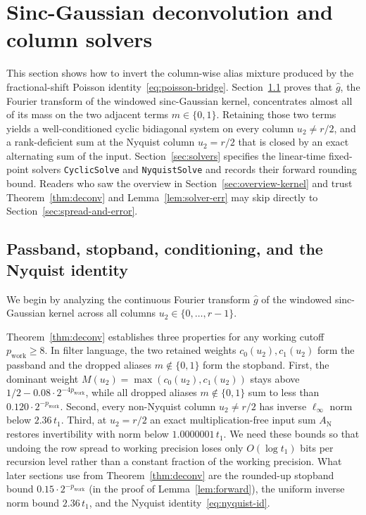 \section{Sinc-Gaussian deconvolution and column solvers}\label{sec:deconv}

This section shows how to invert the column-wise alias mixture produced by the fractional-shift Poisson identity~\eqref{eq:poisson-bridge}. Section~\ref{sec:deconv-thm} proves that $\hat{g}$, the Fourier transform of the windowed sinc-Gaussian kernel, concentrates almost all of its mass on the two adjacent terms $m \in \{0, 1\}$. Retaining those two terms yields a well-conditioned cyclic bidiagonal system on every column $u_2 \ne r/2$, and a rank-deficient sum at the Nyquist column $u_2 = r/2$ that is closed by an exact alternating sum of the input. Section~\ref{sec:solvers} specifies the linear-time fixed-point solvers \texttt{CyclicSolve} and \texttt{NyquistSolve} and records their forward rounding bound. Readers who saw the overview in Section~\ref{sec:overview-kernel} and trust Theorem~\ref{thm:deconv} and Lemma~\ref{lem:solver-err} may skip directly to Section~\ref{sec:spread-and-error}.

\subsection{Passband, stopband, conditioning, and the Nyquist identity}\label{sec:deconv-thm}

We begin by analyzing the continuous Fourier transform $\hat{g}$ of the windowed sinc-Gaussian kernel across all columns $u_2 \in \{0, \dots, r-1\}$.

Theorem~\ref{thm:deconv} establishes three properties for any working cutoff $p_{\mathrm{work}} \ge 8$. In filter language, the two retained weights $c_0(u_2), c_1(u_2)$ form the passband and the dropped aliases $m \notin \{0, 1\}$ form the stopband. First, the dominant weight $M(u_2) = \max(c_0(u_2), c_1(u_2))$ stays above $1/2 - 0.08 \cdot 2^{-4 p_{\mathrm{work}}}$, while all dropped aliases $m \notin \{0, 1\}$ sum to less than $0.120 \cdot 2^{-p_{\mathrm{work}}}$. Second, every non-Nyquist column $u_2 \ne r/2$ has inverse $\ell_\infty$ norm below $2.36\,t_1$. Third, at $u_2 = r/2$ an exact multiplication-free input sum $A_{\mathrm{N}}$ restores invertibility with norm below $1.0000001\,t_1$. We need these bounds so that undoing the row spread to working precision loses only $O(\log t_1)$ bits per recursion level rather than a constant fraction of the working precision. What later sections use from Theorem~\ref{thm:deconv} are the rounded-up stopband bound $0.15 \cdot 2^{-p_{\mathrm{work}}}$ (in the proof of Lemma~\ref{lem:forward}), the uniform inverse norm bound $2.36\,t_1$, and the Nyquist identity~\eqref{eq:nyquist-id}.

